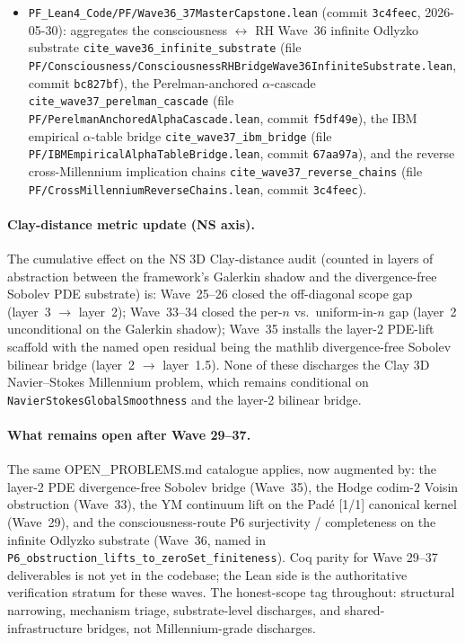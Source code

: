 \begin{itemize}
  \texttt{e1857f1}, 2026-05-30): aggregates the NS 3D layer-2 PDE lift
  SCAFFOLD \texttt{cite\_ns\_3d\_layer2\_lift\_scaffold} (file
  \texttt{PF/NS3DLayer2LiftAttempt.lean}, commit \texttt{e1857f1}) and
  the consciousness $\leftrightarrow$ RH Wave~35 five-point substrate
  witness \texttt{cite\_consciousness\_RH\_wave35\_fivepoint} (file
  \texttt{PF/Consciousness/ConsciousnessRHBridgeWave35Witnesses.lean},
  commit \texttt{56e67d2}).
\item \texttt{PF\_Lean4\_Code/PF/Wave36\_37MasterCapstone.lean}
  (commit \texttt{3c4feec}, 2026-05-30): aggregates the
  consciousness $\leftrightarrow$ RH Wave~36 infinite Odlyzko substrate
  \texttt{cite\_wave36\_infinite\_substrate} (file
  \texttt{PF/Consciousness/ConsciousnessRHBridgeWave36InfiniteSubstrate.lean},
  commit \texttt{bc827bf}), the Perelman-anchored $\alpha$-cascade
  \texttt{cite\_wave37\_perelman\_cascade} (file
  \texttt{PF/PerelmanAnchoredAlphaCascade.lean}, commit
  \texttt{f5df49e}), the IBM empirical $\alpha$-table bridge
  \texttt{cite\_wave37\_ibm\_bridge} (file
  \texttt{PF/IBMEmpiricalAlphaTableBridge.lean}, commit
  \texttt{67aa97a}), and the reverse cross-Millennium implication
  chains \texttt{cite\_wave37\_reverse\_chains} (file
  \texttt{PF/CrossMillenniumReverseChains.lean}, commit
  \texttt{3c4feec}).
\end{itemize}

\paragraph{Clay-distance metric update (NS axis).} The cumulative
effect on the NS 3D Clay-distance audit (counted in layers of
abstraction between the framework's Galerkin shadow and the
divergence-free Sobolev PDE substrate) is: Wave~25--26 closed
the off-diagonal scope gap (layer~3 $\to$ layer~2); Wave~33--34
closed the per-$n$ vs.\ uniform-in-$n$ gap (layer~2 unconditional on
the Galerkin shadow); Wave~35 installs the layer-2 PDE-lift scaffold
with the named open residual being the mathlib divergence-free
Sobolev bilinear bridge (layer~2 $\to$ layer~1.5). None of these
discharges the Clay 3D Navier--Stokes Millennium problem, which
remains conditional on
\texttt{NavierStokesGlobalSmoothness} and the layer-2 bilinear
bridge.

\paragraph{What remains open after Wave 29--37.} The same OPEN\_PROBLEMS.md
catalogue applies, now augmented by: the layer-2 PDE divergence-free
Sobolev bridge (Wave~35), the Hodge codim-$2$ Voisin obstruction
(Wave~33), the YM continuum lift on the Padé [1/1] canonical kernel
(Wave~29), and the consciousness-route P6 surjectivity / completeness
on the infinite Odlyzko substrate (Wave~36, named in
\texttt{P6\_obstruction\_lifts\_to\_zeroSet\_finiteness}). Coq parity
for Wave 29--37 deliverables is not yet in the codebase; the Lean
side is the authoritative verification stratum for these waves. The
honest-scope tag throughout: structural narrowing, mechanism triage,
substrate-level discharges, and shared-infrastructure bridges, not
Millennium-grade discharges.

